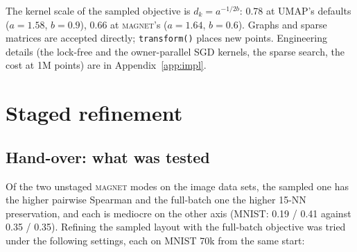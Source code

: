 \documentclass[11pt]{article}
\newcommand{\magnet}{\textsc{magnet}}
\begin{document}
The kernel scale of the sampled objective is $d_k = a^{-1/2b}$: 0.78 at UMAP's defaults
($a = 1.58$, $b = 0.9$), 0.66 at \magnet{}'s ($a = 1.64$, $b = 0.6$). Graphs and sparse matrices are
accepted directly; \texttt{transform()} places new points. Engineering details (the lock-free and the
owner-parallel SGD kernels, the sparse search, the cost at 1M points) are in Appendix~\ref{app:impl}.

\section{Staged refinement}\label{sec:staged}
\subsection{Hand-over: what was tested}\label{sec:handover}
Of the two unstaged \magnet{} modes on the image data sets, the sampled one has the higher pairwise
Spearman and the full-batch one the higher 15-NN preservation, and each is mediocre on the other axis
(MNIST: 0.19 / 0.41 against 0.35 / 0.35). Refining the sampled layout with the full-batch objective was tried under
the following settings, each on MNIST 70k from the same start:
\end{document}

